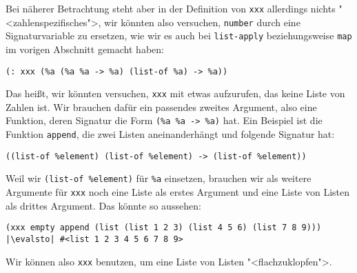 %
Bei näherer Betrachtung steht aber in der Definition von
\lstinline{xxx} allerdings nichts "<zahlenspezifisches">, wir könnten
also versuchen, \lstinline{number} durch eine Signaturvariable zu
ersetzen, wie wir es auch bei \lstinline{list-apply} beziehungsweise \lstinline{map} im vorigen
Abschnitt gemacht haben:
%
\begin{lstlisting}
(: xxx (%a (%a %a -> %a) (list-of %a) -> %a))
\end{lstlisting}
%
Das heißt, wir könnten versuchen, \lstinline{xxx} mit etwas
aufzurufen, das keine Liste von Zahlen ist.  Wir brauchen dafür ein
passendes zweites Argument, also eine
Funktion, deren Signatur die Form \lstinline{(%a %a -> %a)} hat.  Ein
Beispiel ist die Funktion \lstinline{append}, die zwei Listen
aneinanderhängt und folgende Signatur hat:
%
\begin{lstlisting}
((list-of %element) (list-of %element) -> (list-of %element))
\end{lstlisting}
% 
Weil wir \lstinline{(list-of %element)} für \lstinline{%a} einsetzen,
brauchen wir als weitere Argumente für \lstinline{xxx} noch eine
Liste als erstes Argument und eine Liste von Listen als drittes
Argument.  Das könnte so aussehen:
%
\begin{lstlisting}
(xxx empty append (list (list 1 2 3) (list 4 5 6) (list 7 8 9)))
|\evalsto| #<list 1 2 3 4 5 6 7 8 9>
\end{lstlisting}
%
Wir können also \lstinline{xxx} benutzen, um eine Liste von Listen
"<flachzuklopfen">.

